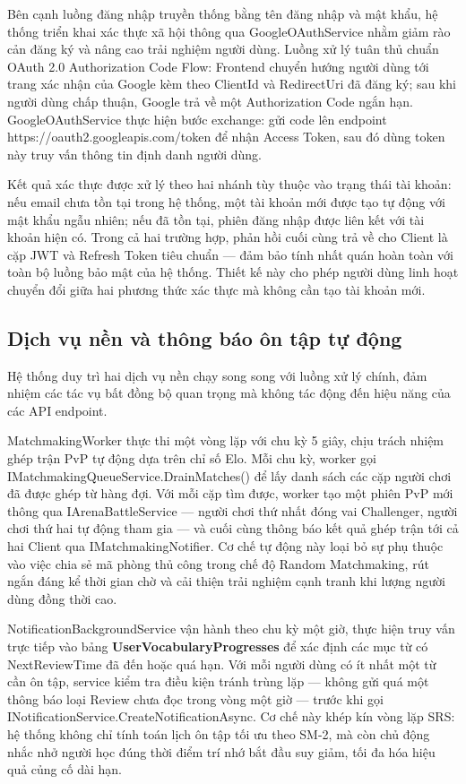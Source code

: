 Bên cạnh luồng đăng nhập truyền thống bằng tên đăng nhập và mật khẩu, hệ thống triển khai xác thực xã hội thông qua GoogleOAuthService nhằm giảm rào cản đăng ký và nâng cao trải nghiệm người dùng. Luồng xử lý tuân thủ chuẩn OAuth 2.0 Authorization Code Flow: Frontend chuyển hướng người dùng tới trang xác nhận của Google kèm theo ClientId và RedirectUri đã đăng ký; sau khi người dùng chấp thuận, Google trả về một Authorization Code ngắn hạn. GoogleOAuthService thực hiện bước exchange: gửi code lên endpoint https://oauth2.googleapis.com/token để nhận Access Token, sau đó dùng token này truy vấn thông tin định danh người dùng.

Kết quả xác thực được xử lý theo hai nhánh tùy thuộc vào trạng thái tài khoản: nếu email chưa tồn tại trong hệ thống, một tài khoản mới được tạo tự động với mật khẩu ngẫu nhiên; nếu đã tồn tại, phiên đăng nhập được liên kết với tài khoản hiện có. Trong cả hai trường hợp, phản hồi cuối cùng trả về cho Client là cặp JWT và Refresh Token tiêu chuẩn — đảm bảo tính nhất quán hoàn toàn với toàn bộ luồng bảo mật của hệ thống. Thiết kế này cho phép người dùng linh hoạt chuyển đổi giữa hai phương thức xác thực mà không cần tạo tài khoản mới.

\subsection{Dịch vụ nền và thông báo ôn tập tự động}

Hệ thống duy trì hai dịch vụ nền chạy song song với luồng xử lý chính, đảm nhiệm các tác vụ bất đồng bộ quan trọng mà không tác động đến hiệu năng của các API endpoint.

MatchmakingWorker thực thi một vòng lặp với chu kỳ 5 giây, chịu trách nhiệm ghép trận PvP tự động dựa trên chỉ số Elo. Mỗi chu kỳ, worker gọi IMatchmakingQueueService.DrainMatches() để lấy danh sách các cặp người chơi đã được ghép từ hàng đợi. Với mỗi cặp tìm được, worker tạo một phiên PvP mới thông qua IArenaBattleService — người chơi thứ nhất đóng vai Challenger, người chơi thứ hai tự động tham gia — và cuối cùng thông báo kết quả ghép trận tới cả hai Client qua IMatchmakingNotifier. Cơ chế tự động này loại bỏ sự phụ thuộc vào việc chia sẻ mã phòng thủ công trong chế độ Random Matchmaking, rút ngắn đáng kể thời gian chờ và cải thiện trải nghiệm cạnh tranh khi lượng người dùng đồng thời cao.

NotificationBackgroundService vận hành theo chu kỳ một giờ, thực hiện truy vấn trực tiếp vào bảng \textbf{UserVocabularyProgresses} để xác định các mục từ có NextReviewTime đã đến hoặc quá hạn. Với mỗi người dùng có ít nhất một từ cần ôn tập, service kiểm tra điều kiện tránh trùng lặp — không gửi quá một thông báo loại Review chưa đọc trong vòng một giờ — trước khi gọi INotificationService.CreateNotificationAsync. Cơ chế này khép kín vòng lặp SRS: hệ thống không chỉ tính toán lịch ôn tập tối ưu theo SM-2, mà còn chủ động nhắc nhở người học đúng thời điểm trí nhớ bắt đầu suy giảm, tối đa hóa hiệu quả củng cố dài hạn.

